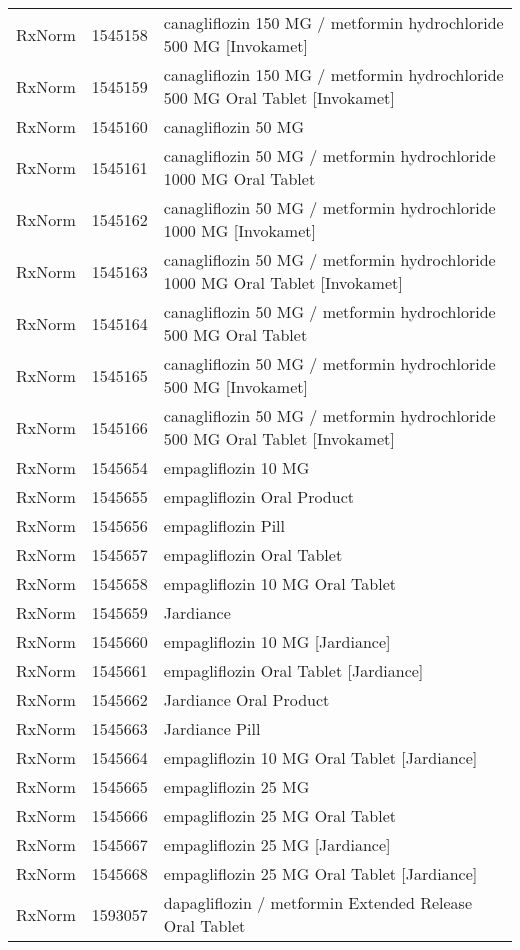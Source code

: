 \begin{longtable}{p{}p{}p{}}
  RxNorm & 1545158 & canagliflozin 150 MG / metformin hydrochloride 500 MG [Invokamet] \\ 
  RxNorm & 1545159 & canagliflozin 150 MG / metformin hydrochloride 500 MG Oral Tablet [Invokamet] \\ 
  RxNorm & 1545160 & canagliflozin 50 MG \\ 
  RxNorm & 1545161 & canagliflozin 50 MG / metformin hydrochloride 1000 MG Oral Tablet \\ 
  RxNorm & 1545162 & canagliflozin 50 MG / metformin hydrochloride 1000 MG [Invokamet] \\ 
  RxNorm & 1545163 & canagliflozin 50 MG / metformin hydrochloride 1000 MG Oral Tablet [Invokamet] \\ 
  RxNorm & 1545164 & canagliflozin 50 MG / metformin hydrochloride 500 MG Oral Tablet \\ 
  RxNorm & 1545165 & canagliflozin 50 MG / metformin hydrochloride 500 MG [Invokamet] \\ 
  RxNorm & 1545166 & canagliflozin 50 MG / metformin hydrochloride 500 MG Oral Tablet [Invokamet] \\ 
  RxNorm & 1545654 & empagliflozin 10 MG \\ 
  RxNorm & 1545655 & empagliflozin Oral Product \\ 
  RxNorm & 1545656 & empagliflozin Pill \\ 
  RxNorm & 1545657 & empagliflozin Oral Tablet \\ 
  RxNorm & 1545658 & empagliflozin 10 MG Oral Tablet \\ 
  RxNorm & 1545659 & Jardiance \\ 
  RxNorm & 1545660 & empagliflozin 10 MG [Jardiance] \\ 
  RxNorm & 1545661 & empagliflozin Oral Tablet [Jardiance] \\ 
  RxNorm & 1545662 & Jardiance Oral Product \\ 
  RxNorm & 1545663 & Jardiance Pill \\ 
  RxNorm & 1545664 & empagliflozin 10 MG Oral Tablet [Jardiance] \\ 
  RxNorm & 1545665 & empagliflozin 25 MG \\ 
  RxNorm & 1545666 & empagliflozin 25 MG Oral Tablet \\ 
  RxNorm & 1545667 & empagliflozin 25 MG [Jardiance] \\ 
  RxNorm & 1545668 & empagliflozin 25 MG Oral Tablet [Jardiance] \\ 
  RxNorm & 1593057 & dapagliflozin / metformin Extended Release Oral Tablet \\ 

\end{longtable}
